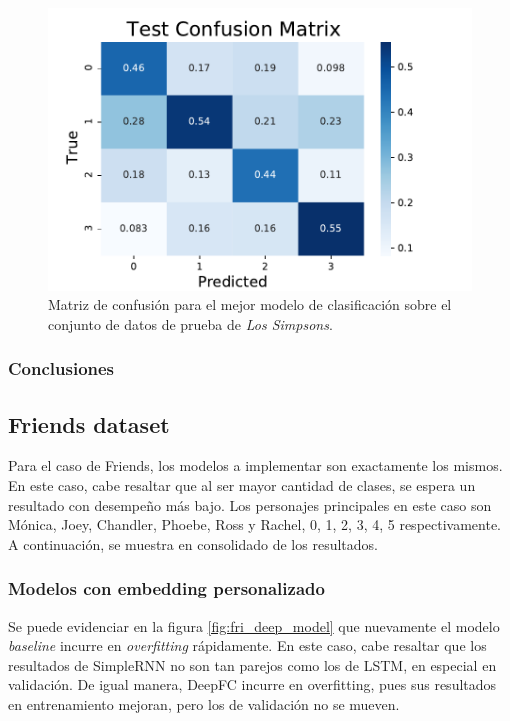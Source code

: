 \begin{figure}[H]
    \centering
    \includegraphics{doc/images/simpsons_test_confusion.pdf}
    \caption{Matriz de confusión para el mejor modelo de clasificación sobre el conjunto de datos de prueba de \textit{Los Simpsons}.}
    \label{fig:em_simpsons_confusion_test}
\end{figure}


\subsubsection{Conclusiones}


\subsection{Friends dataset}
Para el caso de Friends, los modelos a implementar son exactamente los mismos. En este caso, cabe resaltar que al ser mayor cantidad de clases, se espera un resultado con desempeño más bajo. Los personajes principales en este caso son Mónica, Joey, Chandler, Phoebe, Ross y Rachel, 0, 1, 2, 3, 4, 5 respectivamente. A continuación, se muestra en consolidado de los resultados.\\

\subsubsection{Modelos con embedding personalizado}

Se puede evidenciar en la figura \ref{fig:fri_deep_model} que nuevamente el modelo \textit{baseline} incurre en \textit{overfitting} rápidamente. En este caso, cabe resaltar que los resultados de SimpleRNN no son tan parejos como los de LSTM, en especial en validación. De igual manera, DeepFC incurre en overfitting, pues sus resultados en entrenamiento mejoran, pero los de validación no se mueven.\\

